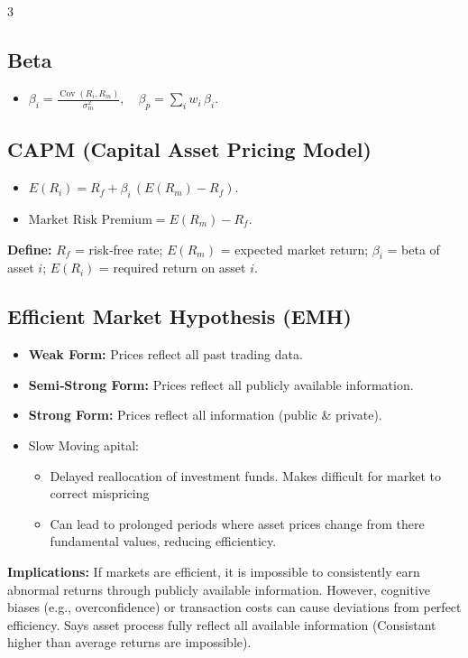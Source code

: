 \documentclass[10pt,landscape,fleqn]{article}
\begin{document}
\begin{multicols}{3}
\subsection*{Beta}
\begin{itemize}
  \item $\beta_i = \frac{\operatorname{Cov}(R_i,R_m)}{\sigma_m^2}, \quad \beta_p = \sum_i w_i\,\beta_i.$
\end{itemize}

\subsection*{CAPM (Capital Asset Pricing Model)}
\begin{itemize}
  \item $E(R_i) = R_f + \beta_i\,(E(R_m) - R_f).$
  \item $\text{Market Risk Premium} = E(R_m) - R_f.$
\end{itemize}
\textbf{Define:} $R_f$ = risk‐free rate; $E(R_m)$ = expected market return; $\beta_i$ = beta of asset $i$; $E(R_i)$ = required return on asset $i$.

\subsection*{Efficient Market Hypothesis (EMH)}
\begin{itemize}
  \item \textbf{Weak Form:} Prices reflect all past trading data.
  \item \textbf{Semi‐Strong Form:} Prices reflect all publicly available information.
  \item \textbf{Strong Form:} Prices reflect all information (public \& private).
  \item Slow Moving apital:
  \begin{itemize}
  \item Delayed reallocation of investment funds. Makes difficult for market to correct mispricing
  \item Can lead to prolonged periods where asset prices change from there fundamental values, reducing efficienticy.
  \end{itemize}
\end{itemize}
\textbf{Implications:} If markets are efficient, it is impossible to consistently earn abnormal returns through publicly available information. However, cognitive biases (e.g., overconfidence) or transaction costs can cause deviations from perfect efficiency. Says asset process fully reflect all available information (Consistant higher than average returns are impossible). 


\end{multicols}
\end{document}
